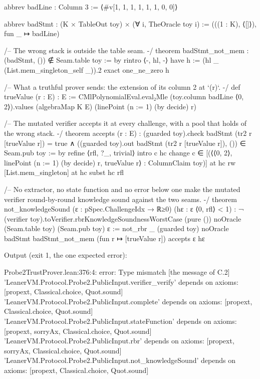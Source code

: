 \begin{leancode}
abbrev badLine : Column 3 := ⟨#v[1, 1, 1, 1, 1, 1, 0, 0]⟩

abbrev badStmt : (K × TableOut toy) × (∀ i, TheOracle toy i) := (((1 : K), ⟨[]⟩), fun _ ↦ badLine)

/-- The wrong stack is outside the table seam. -/
theorem badStmt_not_mem : (badStmt, ()) ∉ Seam.table toy := by
  rintro ⟨-, hl, -⟩
  have h := (hl _ (List.mem_singleton_self _)).2
  exact one_ne_zero h

/-- What a truthful prover sends: the extension of its column 2 at `(r)`. -/
def trueValue (r : E) : E :=
  CMlPolynomialEval.eval₂Mle (toy.column badLine ⟨0, 2⟩).values (algebraMap K E)
    (linePoint (n := 1) (by decide) r)

/-- The mutated verifier accepts it at every challenge, with a pool that holds of the wrong
stack. -/
theorem accepts (r : E) :
    (guarded toy).check badStmt (tr2 r [trueValue r]) = true ∧
      ((guarded toy).out badStmt (tr2 r [trueValue r]), ()) ∈ Seam.pub toy := by
  refine ⟨rfl, ?_, trivial⟩
  intro c hc
  change c ∈ [(⟨⟨0, 2⟩, linePoint (n := 1) (by decide) r, trueValue r⟩ : ColumnClaim toy)] at hc
  rw [List.mem_singleton] at hc
  subst hc
  rfl

/-- No extractor, no state function and no error below one make the mutated verifier
round-by-round knowledge sound against the two seams. -/
theorem not_knowledgeSound (ε : pSpec.ChallengeIdx → ℝ≥0) (hε : ε ⟨0, rfl⟩ < 1) :
    ¬ (verifier toy).toVerifier.rbrKnowledgeSoundnessWorstCase (pure ()) noOracle
      (Seam.table toy) (Seam.pub toy) ε :=
  not_rbr _ (guarded toy) noOracle badStmt badStmt_not_mem (fun r ↦ [trueValue r]) accepts ε hε
\end{leancode}

Output (exit 1, the one expected error):

\begin{srccode}
Probe2TrustProver.lean:376:4: error: Type mismatch   [the message of C.2]
'LeanerVM.Protocol.Probe2.PublicInput.verifier_verify' depends on axioms: [propext, Classical.choice, Quot.sound]
'LeanerVM.Protocol.Probe2.PublicInput.complete' depends on axioms: [propext, Classical.choice, Quot.sound]
'LeanerVM.Protocol.Probe2.PublicInput.stateFunction' depends on axioms: [propext, sorryAx, Classical.choice, Quot.sound]
'LeanerVM.Protocol.Probe2.PublicInput.rbr' depends on axioms: [propext, sorryAx, Classical.choice, Quot.sound]
'LeanerVM.Protocol.Probe2.PublicInput.not_knowledgeSound' depends on axioms: [propext, Classical.choice, Quot.sound]
\end{srccode}

